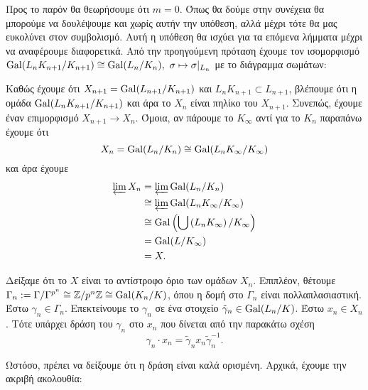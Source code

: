     \noindent Προς το παρόν θα θεωρήσουμε ότι $m=0$. Όπως θα δούμε στην συνέχεια θα μπορούμε να δουλέψουμε και χωρίς αυτήν την υπόθεση, αλλά μέχρι τότε θα μας ευκολύνει στον συμβολισμό. Αυτή η υπόθεση θα ισχύει για τα επόμενα λήμματα μέχρι να αναφέρουμε διαφορετικά. Από την προηγούμενη πρόταση έχουμε τον ισομορφισμό $\Gal(L_nK_{n+1}/K_{n+1}) \cong \Gal(L_n/K_n), \ \sigma \mapsto \sigma|_{L_n}$ με το διάγραμμα σωμάτων:
    \begin{figure}[H]
        \centering
    \end{figure}

    \noindent Καθώς έχουμε ότι $X_{n+1} = \operatorname{Gal}(L_{n+1}/K_{n+1}) $ και $L_n K_{n+1} \subset L_{n+1}$, βλέπουμε ότι η ομάδα 
    $\operatorname{Gal}(L_nK_{n+1}/K_{n+1})$ και άρα το $X_n$ είναι πηλίκο του $X_{n+1}$. Συνεπώς, έχουμε έναν επιμορφισμό $X_{n+1} \rightarrow X_n$. Όμοια, αν πάρουμε το $K_\infty$ αντί για το $K_n$ παραπάνω έχουμε ότι
$$X_n = \operatorname{Gal}(L_n/K_n) \cong \operatorname{Gal}(L_n K_\infty/K_\infty)$$ και άρα έχουμε
\begin{align*}
    \varprojlim X_n &= \varprojlim \operatorname{Gal}(L_n/K_n) \\
    &\cong \varprojlim \operatorname{Gal}(L_n K_\infty/K_\infty) \\
    &\cong \operatorname{Gal} \left( \bigcup\left(L_n K_\infty\right)/K_\infty \right) \\
    &= \operatorname{Gal}(L/K_\infty) \\
    &= X.
\end{align*}

\noindent Δείξαμε ότι το $X$ είναι το αντίστροφο όριο των ομάδων $X_n$. Επιπλέον, θέτουμε $\Gamma_n := \Gamma/\Gamma^{p^n} \cong \mathbb{Z}/p^n \mathbb{Z} \cong \operatorname{Gal}(K_n/K)$, όπου η δομή στο $\Gamma_n$ είναι πολλαπλασιαστική. Έστω $\gamma_n \in \Gamma_n$. Επεκτείνουμε το $\gamma_n$ σε ένα στοιχείο $\tilde{\gamma}_n \in \operatorname{Gal}(L_n/K)$. Έστω $x_n \in X_n$. Τότε υπάρχει δράση του $\gamma_n$ στο $x_n$ που δίνεται από την παρακάτω σχέση
$$\gamma_n \cdot x_n = \tilde{\gamma}_n x_n \tilde{\gamma}_n^{-1}.$$

\noindent Ωστόσο, πρέπει να δείξουμε ότι η δράση είναι καλά ορισμένη. Αρχικά, έχουμε την ακριβή ακολουθία:
\begin{figure}[H]
    \centering
{}
\end{figure}

